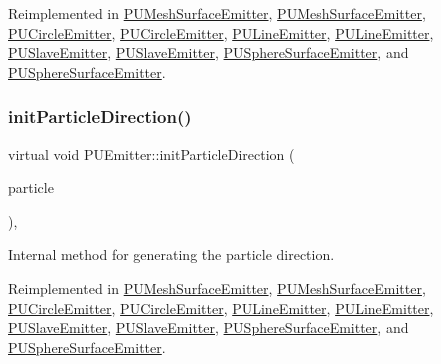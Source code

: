 Reimplemented in \hyperlink{classPUMeshSurfaceEmitter_a57b3e6788ced8af0dc152f0198fd7f97}{P\+U\+Mesh\+Surface\+Emitter}, \hyperlink{classPUMeshSurfaceEmitter_a82636aed091cff08d53a109343895f35}{P\+U\+Mesh\+Surface\+Emitter}, \hyperlink{classPUCircleEmitter_ae1e552dbbcd6df4a4e313a887a5d882c}{P\+U\+Circle\+Emitter}, \hyperlink{classPUCircleEmitter_aaf9f5cd827deabac2b6f9e5417483403}{P\+U\+Circle\+Emitter}, \hyperlink{classPULineEmitter_a5caf11b317242d3b6b58f99c7a3de0ed}{P\+U\+Line\+Emitter}, \hyperlink{classPULineEmitter_a9c2cf66c33150c25e546faf6cf3244aa}{P\+U\+Line\+Emitter}, \hyperlink{classPUSlaveEmitter_a80d517e16cea272c8b762d7b6e237868}{P\+U\+Slave\+Emitter}, \hyperlink{classPUSlaveEmitter_ae52196734cc114bcd5293f9489c167ba}{P\+U\+Slave\+Emitter}, \hyperlink{classPUSphereSurfaceEmitter_ae3cf2112066b7107ad740d1a70fd52ef}{P\+U\+Sphere\+Surface\+Emitter}, and \hyperlink{classPUSphereSurfaceEmitter_aec51594f52f1d4cbeef45f0fc64752db}{P\+U\+Sphere\+Surface\+Emitter}.

\mbox{\label{classPUEmitter_ae9253c4848b3d942c4d9b223ed6907a2}} 
\subsubsection{\texorpdfstring{init\+Particle\+Direction()}{initParticleDirection()}\hspace{0.1cm}{\footnotesize\ttfamily [2/2]}}
{\footnotesize\ttfamily virtual void P\+U\+Emitter\+::init\+Particle\+Direction (\begin{DoxyParamCaption}\item[{\hyperlink{structPUParticle3D}{P\+U\+Particle3D} $\ast$}]{particle }\end{DoxyParamCaption})\hspace{0.3cm}{\ttfamily [protected]}, {\ttfamily [virtual]}}

Internal method for generating the particle direction. 

Reimplemented in \hyperlink{classPUMeshSurfaceEmitter_a57b3e6788ced8af0dc152f0198fd7f97}{P\+U\+Mesh\+Surface\+Emitter}, \hyperlink{classPUMeshSurfaceEmitter_a82636aed091cff08d53a109343895f35}{P\+U\+Mesh\+Surface\+Emitter}, \hyperlink{classPUCircleEmitter_ae1e552dbbcd6df4a4e313a887a5d882c}{P\+U\+Circle\+Emitter}, \hyperlink{classPUCircleEmitter_aaf9f5cd827deabac2b6f9e5417483403}{P\+U\+Circle\+Emitter}, \hyperlink{classPULineEmitter_a5caf11b317242d3b6b58f99c7a3de0ed}{P\+U\+Line\+Emitter}, \hyperlink{classPULineEmitter_a9c2cf66c33150c25e546faf6cf3244aa}{P\+U\+Line\+Emitter}, \hyperlink{classPUSlaveEmitter_a80d517e16cea272c8b762d7b6e237868}{P\+U\+Slave\+Emitter}, \hyperlink{classPUSlaveEmitter_ae52196734cc114bcd5293f9489c167ba}{P\+U\+Slave\+Emitter}, \hyperlink{classPUSphereSurfaceEmitter_ae3cf2112066b7107ad740d1a70fd52ef}{P\+U\+Sphere\+Surface\+Emitter}, and \hyperlink{classPUSphereSurfaceEmitter_aec51594f52f1d4cbeef45f0fc64752db}{P\+U\+Sphere\+Surface\+Emitter}.

